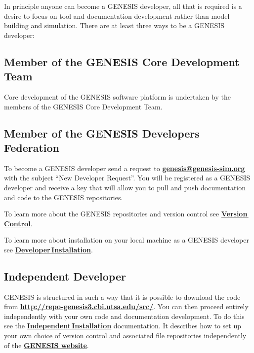 \documentclass[12pt]{article}
\begin{document}
In principle anyone can become a GENESIS developer, all that is required is a desire to focus on tool and documentation development rather than model building and simulation. There are at least three ways to be a GENESIS  developer:

\subsection*{Member of the GENESIS Core Development Team}

Core development of the GENESIS software platform is undertaken by the members of the GENESIS Core Development Team.

\subsection*{Member of the GENESIS Developers Federation}

To become a GENESIS developer send a request to \href{mailto:genesis@genesis-sim.org}{\bf genesis@genesis-sim.org} with the subject ``New Developer Request''. You will be registered as a GENESIS developer and receive a key that will allow you to pull and push documentation and code to the GENESIS repositories.

To learn more about the GENESIS repositories and version control see \href{../version-control/version-control.tex}{\bf Version\,Control}.
	
To learn more about installation on your local machine as a GENESIS developer see \href{../installation-developer/installation-developer.tex}{\bf Developer\,Installation}.

\subsection*{\bf Independent Developer}

GENESIS is structured in such a way that it is possible to download the code from \href{http://repo-genesis3.cbi.utsa.edu/src/}{\bf http://repo-genesis3.cbi.utsa.edu/src/}. You can then proceed entirely independently with your own code and documentation development. To do this see the \href{../installation-independent/installation-independent.tex}{\bf Independent\,Installation} documentation. It describes how to set up your own choice of version control and associated file repositories independently of the \href{http://www.genesis-sim.org/}{\bf GENESIS website}.



\end{document}
